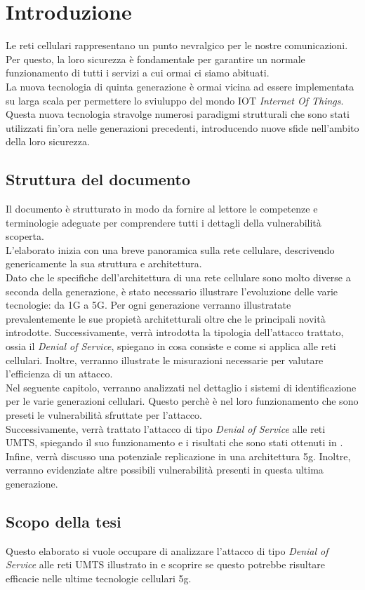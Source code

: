 \section{Introduzione}
Le reti cellulari rappresentano un punto nevralgico per le nostre comunicazioni.
Per questo, la loro sicurezza è fondamentale per garantire un normale funzionamento
di tutti i servizi a cui ormai ci siamo abituati.\\
La nuova tecnologia di quinta generazione è ormai vicina ad essere implementata su larga scala
per permettere lo sviuluppo del mondo IOT \textit{Internet Of Things}. Questa nuova tecnologia stravolge numerosi
paradigmi strutturali che sono stati utilizzati fin'ora nelle generazioni precedenti, introducendo nuove sfide nell'ambito
della loro sicurezza.
\subsection{Struttura del documento}
Il documento è strutturato in modo da fornire al lettore le competenze e terminologie adeguate per comprendere tutti i dettagli della 
vulnerabilità scoperta.\\
L'elaborato inizia con una breve panoramica sulla rete cellulare, descrivendo genericamente la sua struttura e architettura.\\ 
Dato che le specifiche dell'architettura di una rete cellulare sono molto diverse a seconda della generazione, è stato 
necessario illustrare l'evoluzione delle varie tecnologie: da 1G a 5G. 
Per ogni generazione verranno illustratate prevalentemente le sue propietà architetturali oltre che le principali novità introdotte.
Successivamente, verrà introdotta la tipologia dell'attacco trattato, ossia il \textit{Denial of Service}, spiegano in cosa consiste
e come si applica alle reti cellulari. Inoltre, verranno illustrate le misurazioni necessarie per valutare l'efficienza di un attacco.\\
Nel seguente capitolo, verranno analizzati nel dettaglio i sistemi di identificazione per le varie generazioni cellulari. Questo perchè è nel 
loro funzionamento che sono preseti le vulnerabilità sfruttate per l'attacco.\\
Successivamente, verrà trattato l'attacco di tipo \textit{Denial of Service} alle reti UMTS, spiegando il suo funzionamento e i risultati che sono stati
ottenuti in \cite{umts-dos}.
Infine, verrà discusso una potenziale replicazione in una architettura 5g. Inoltre, verranno evidenziate altre possibili vulnerabilità presenti in questa 
ultima generazione.
\subsection{Scopo della tesi}
Questo elaborato si vuole occupare di analizzare l'attacco di tipo \textit{Denial of Service}
alle reti UMTS illustrato in \cite{umts-dos} e scoprire se questo potrebbe risultare efficacie nelle ultime
tecnologie cellulari 5g.